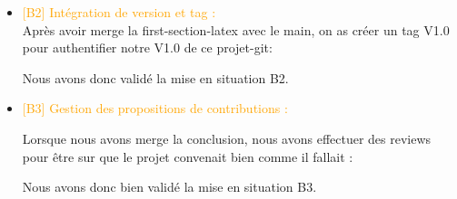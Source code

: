 \begin{itemize}
    \item \textcolor{orange}{[B2] Intégration de version et tag : }
    \\Après avoir merge la first-section-latex avec le main, on as créer un tag V1.0 pour authentifier notre V1.0 de ce projet-git:

    
    

    Nous avons donc validé la mise en situation B2.
    
    \item \textcolor{orange}{[B3] Gestion des propositions de contributions : }

    Lorsque nous avons merge la conclusion, nous avons effectuer des reviews pour être sur que le projet convenait bien comme il fallait :


    Nous avons donc bien validé la mise en situation B3.
    

\end{itemize}
